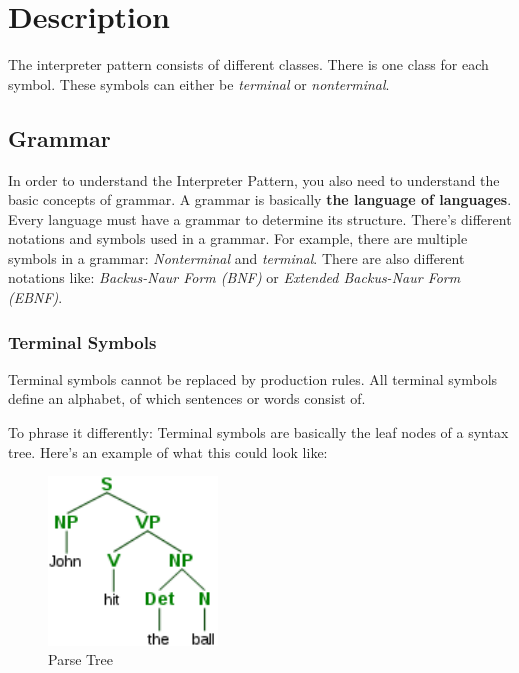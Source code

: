 \chapter{Description}

The interpreter pattern consists of different classes. There is one class for each symbol. These symbols can either be \textit{terminal} or \textit{nonterminal}. 


\section{Grammar}

In order to understand the Interpreter Pattern, you also need to understand the basic concepts of grammar. A grammar is basically \textbf{the language of languages}. Every language must have a grammar to determine its structure. There's different notations and symbols used in a grammar. For example, there are multiple symbols in a grammar: \textit{Nonterminal} and \textit{terminal}. There are also different notations like: \textit{Backus-Naur Form (BNF)} or \textit{Extended Backus-Naur Form (EBNF)}.


\subsection{Terminal Symbols}
\label{sec:terminal-symbols}

Terminal symbols cannot be replaced by production rules. All terminal symbols define an alphabet, of which sentences or words consist of.

To phrase it differently: Terminal symbols are basically the leaf nodes of a syntax tree. Here's an example of what this could look like: 

\begin{figure}[H]
    \centering
        \includegraphics[width=0.4\textwidth]{figures/parse-tree.png}
        \caption{Parse Tree}
\end{figure}


